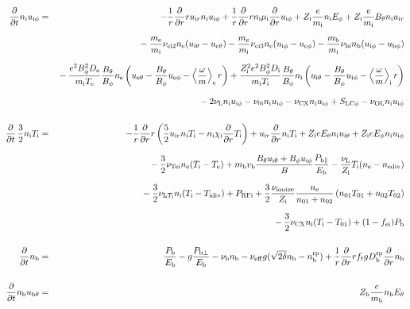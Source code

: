 \documentclass[11pt]{article}
\def\r#1{{\rm#1}}
\def\ddt{\frac{\partial}{\partial t}}
\def\ddr{\frac{\partial}{\partial r}}
\def\ave#1{\left\langle#1\right\rangle}
\def\me{m_\r{e}}
\def\mi{m_\r{i}}
\def\mb{m_\r{b}}
\def\mui{\mu_\r{i}}
\def\De{D_\r{e}}
\def\Di{D_\r{i}}
\def\chii{\chi_\r{i}}
\def\ne{n_\r{e}}
\def\ni{n_\r{i}}
\def\nb{n_\r{b}}
\def\uir{u_{\r{i}r}}
\def\ueth{u_{\r{e}\theta}}
\def\uith{u_{\r{i}\theta}}
\def\ubth{u_{\r{b}\theta}}
\def\ueph{u_{\r{e}\phi}}
\def\uiph{u_{\r{i}\phi}}
\def\ubph{u_{\r{b}\phi}}
\def\Eth{E_\theta}
\def\Eph{E_\phi}
\def\Bth{B_\theta}
\def\Bph{B_\phi}
\def\Te{T_\r{e}}
\def\Ti{T_\r{i}}
\def\nna{n_{01}}
\def\nnb{n_{02}}
\def\Zi{Z_\r{i}}
\def\Zb{Z_\r{b}}
\def\Pb{P_\r{b}}
\def\Eb{E_\r{b}}
\def\PRFi{P_\r{RFi}}
\def\Tna{T_{01}}
\def\Tnb{T_{02}}
\def\fei{f_\r{ei}}
\def\nbrp{n_\r{b}^\r{rp}}
\def\Pbpara{P_{\r{b}\parallel}}
\def\Pbperp{P_{\r{b}\perp}}
\def\nueff{\nu_\r{eff}}
\def\Dbrp{D_\r{b}^\r{rp}}
\def\nubi{\nu_\r{bi}}
\def\nuni{\nu_\r{0i}}
\def\nuL{\nu_\r{L}}
\def\nuCX{\nu_\r{CX}}
\def\nuion{\nu_\r{ionize}}
\def\nub{\nu_\r{b}}
\def\nuTei{\nu_\r{Tei}}
\def\vb{v_\r{b}}
\def\nediv{n_\r{ediv}}
\def\Tidiv{T_\r{idiv}}
\def\nuLTi{\nu_{\r{L}T_\r{i}}}
\def\nuOL{\nu_\r{OL}}
\begin{document}
\begin{eqnarray}
%
%
\\[5mm]
%
%
  \ddt \ni \uiph &=&
%
  - \frac{1}{r} \ddr r \uir \ni \uiph
%
  + \frac{1}{r} \ddr r \ni \mui \ddr \uiph
%
  + \Zi \frac{e}{\mi} \ni \Eph
%
  + \Zi \frac{e}{\mi} \Bth \ni \uir 
\nonumber\\[2.5mm]&&{}
%
  - \frac{\me}{\mi} \nu_\r{ei2} \ne (\uith - \ueth)
%
  - \frac{\me}{\mi} \nu_\r{ei3} \ne (\uiph - \ueph)
%
  - \frac{\mb}{\mi} \nubi \nb (\uiph - \ubph)
\nonumber\\[2.5mm]&&{}
%
  - \frac{e^2 \Bph^2 \De}{\mi\Te}\frac{\Bth}{\Bph}\ne
    \left(\ueth - \frac{\Bth}{\Bph}\ueph - \ave{\frac{\omega}{m}}_\r{e}
     r \right)
%
  + \frac{\Zi^2 e^2 \Bph^2 \Di}{\mi\Ti}\frac{\Bth}{\Bph}\ni
    \left(\uith - \frac{\Bth}{\Bph}\uiph - \ave{\frac{\omega}{m}}_\r{i}
     r \right)
\nonumber\\[2.5mm]&&{}
%
  - 2 \nuL \ni \uiph
%
  - \nuni \ni \uiph
%
  - \nuCX \ni \uiph
%
  + S_\r{LC\phi}
%
  - \nuOL \ni \uiph
%
%
\\[5mm]
%
%
  \ddt \, \frac{3}{2} \ni \Ti &=&
%
 - \frac{1}{r} \ddr r
   \left( \frac{5}{2} \uir \ni \Ti - \ni \chii \ddr \Ti \right)
%
  + \uir \ddr \ni \Ti
%
  + \Zi e \Eth \ni \uith
%
  + \Zi e \Eph \ni \uiph
\nonumber\\[2.5mm]&&{}
%
  - \frac{3}{2} \nuTei \ne (\Ti - \Te)
%
  + \mb \vb \frac{\Bth \uith + \Bph \uiph}{B} \frac{\Pbpara}{\Eb}
%
  - \frac{\nuL}{\Zi} \Ti (\ne - \nediv)
\nonumber\\[2.5mm]&&{}
%
  - \frac{3}{2} \nuLTi \ni (\Ti - \Tidiv)
%
  + \PRFi
%
  + \frac{3}{2} \frac{\nuion}{\Zi} \frac{\ne}{\nna +\nnb}\, (\nna \Tna +
  \nnb \Tnb)
\nonumber\\[2.5mm]&&{}
%
  - \frac{3}{2} \nuCX \ni (\Ti - \Tna)
%
  + (1 - \fei) \Pb
\\[5mm]
%
%
  \ddt \nb &=&
%
    \frac{\Pb}{\Eb}
%
  - g \frac{\Pbperp}{\Eb}
%
  - \nub \nb
%
  - \nueff g (\sqrt{2\delta} \nb - \nbrp)
%
  + \frac{1}{r} \ddr r f_t g \Dbrp \ddr \nb
\\[5mm]
%
%
  \ddt \nb \ubth &=&
%
    \Zb \frac{e}{\mb} \nb \Eth

\end{eqnarray}
\end{document}
